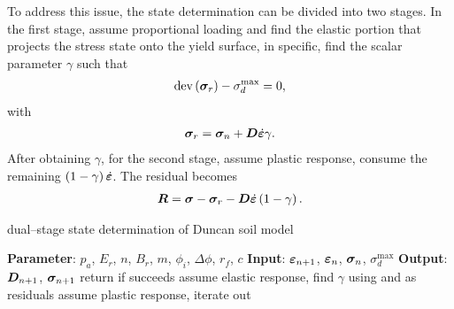 To address this issue, the state determination can be divided into two stages. In the first stage, assume proportional loading and find the elastic portion that projects the stress state onto the yield surface, in specific, find the scalar parameter $\gamma$ such that
\begin{gather}\label{eq:ds_1st_stage_a}
\text{dev}\left(\bm{\sigma}_r\right)-\sigma_d^\text{max}=0,
\end{gather}
with
\begin{gather}\label{eq:ds_1st_stage_b}
\bm{\sigma}_r=\bm{\sigma}_n+\bm{D}\dot{\bm{\varepsilon}}\gamma.
\end{gather}
After obtaining $\gamma$, for the second stage, assume plastic response, consume the remaining $\left(1-\gamma\right)\dot{\bm{\varepsilon}}$. The residual becomes
\begin{gather}\label{eq:ds_two_stage}
\bm{R}=\bm{\sigma}-\bm{\sigma}_r-\bm{D}\dot{\bm{\varepsilon}}\left(1-\gamma\right).
\end{gather}

\begin{breakablealgorithm}
\caption{dual--stage state determination of Duncan soil model}\label{algo:duncan_two_stage}
\begin{algorithmic}
\State \textbf{Parameter}: $p_a$, $E_r$, $n$, $B_r$, $m$, $\phi_i$, $\Delta\phi$, $r_f$, $c$
\State \textbf{Input}: $\bm{\varepsilon}_{n+1}$, $\bm{\varepsilon}_n$, $\bm{\sigma}_n$, $\sigma_d^{\text{max}}$
\State \textbf{Output}: $\bm{D}_{n+1}$, $\bm{\sigma}_{n+1}$
\State return if  succeeds
\State assume elastic response, find $\gamma$ using  and  as residuals
\State assume plastic response, iterate out 
\end{algorithmic}
\end{breakablealgorithm}
